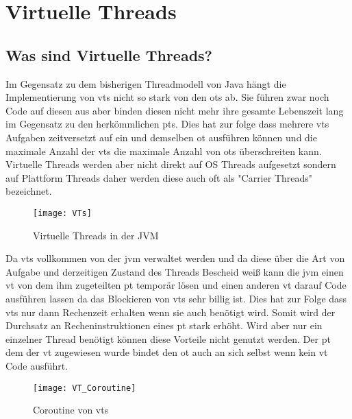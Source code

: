     

\section{Virtuelle Threads}                                 %
\label{sec:VirtuelleThreads}


\subsection{Was sind Virtuelle Threads?}
\label{subsec:WassindVTs?}

    Im Gegensatz zu dem bisherigen Threadmodell von Java hängt die Implementierung von \Glspl{vt} nicht so stark von den \Glspl{ot} ab. Sie führen zwar noch Code 
    auf diesen aus aber binden diesen nicht mehr ihre gesamte Lebenszeit lang im Gegensatz zu den herkömmlichen \Glspl{pt}. Dies hat zur folge dass mehrere 
    \Glspl{vt} Aufgaben zeitversetzt auf ein und demselben \gls{ot} ausführen können und die maximale Anzahl der \Glspl{vt}
    die maximale Anzahl von \Glspl{ot} überschreiten kann.
    Virtuelle Threads werden aber nicht direkt auf OS Threads aufgesetzt sondern auf Plattform Threads daher werden diese auch oft als "Carrier Threads" bezeichnet.
    \cite{ieee2022}

    \begin{figure}[H]
        \centering
        \texttt{[image: VTs]}
        \caption{Virtuelle Threads in der JVM}
        \label{fig:VTs}
    \end{figure}

    Da \Glspl{vt} vollkommen von der \gls{jvm} verwaltet werden und da diese über die Art von Aufgabe und derzeitigen Zustand des Threads Bescheid weiß kann die
    \gls{jvm} einen \gls{vt} von dem ihm zugeteilten \gls{pt} temporär lösen und einen anderen \gls{vt} darauf Code ausführen lassen da das Blockieren von \Glspl{vt}
    sehr billig ist. Dies hat zur Folge dass \Glspl{vt} nur dann Rechenzeit erhalten wenn sie auch benötigt wird. Somit wird der Durchsatz an Recheninstruktionen
    eines \gls{pt} stark erhöht.
    Wird aber nur ein einzelner Thread benötigt können diese Vorteile nicht genutzt werden. Der \gls{pt} dem der \gls{vt} zugewiesen wurde bindet den \gls{ot} auch an sich
    selbst wenn kein \gls{vt} Code ausführt.
    \cite{JEP444}

    \begin{figure}[H]
        \centering
        \texttt{[image: VT\_Coroutine]}
        \caption{Coroutine von \Glspl{vt}}
        \label{fig:VT_Coroutine}
    \end{figure}


